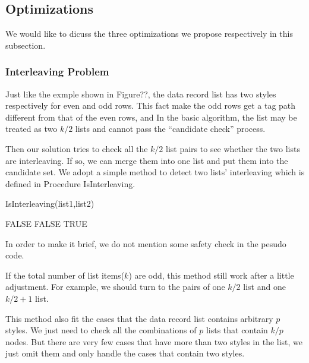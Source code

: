 \subsection{Optimizations}

We would like to dicuss the three optimizations we propose 
respectively in this subsection.

\subsubsection*{Interleaving Problem}

Just like the exmple shown in Figure??,
the data record list has two styles respectively 
for even and odd rows.
This fact make the odd rows get a tag path different from that of the even rows,
and
In the basic algorithm, 
the list may be treated as two $k/2$ lists 
and cannot pass the ``candidate check'' process.

Then our solution tries to check all the $k/2$ list pairs 
to see whether the two lists are interleaving.
If so,
we can merge them into one list and put them into the candidate set.
We adopt a simple method to detect two lists' interleaving
which is defined in Procedure IsInterleaving.

\begin{algorithm}[htbp]
\caption{IsInterleaving(list1,list2)}
\begin{algorithmic}[1]\label{algo:interleave}

		\ELSE
			\RETURN FALSE	
		\ENDIF		
	\ENDIF
			\RETURN FALSE	
		\ENDIF		
	\ENDWHILE	
	\RETURN TRUE
\end{algorithmic}
\end{algorithm}

In order to make it brief, 
we do not mention some safety check in the pesudo code.

If the total number of list items($k$) are odd, this method still work after a little adjustment.
For example, we should turn to the pairs of one $k/2$ list and one $k/2+1$ list.

This method also fit the cases that the data record list contains arbitrary $p$ styles.
We just need to check all the combinations of $p$ lists that contain $k/p$ nodes.
But there are very few cases that have more than two styles in the list, 
we just omit them and only handle the cases that contain two styles.

